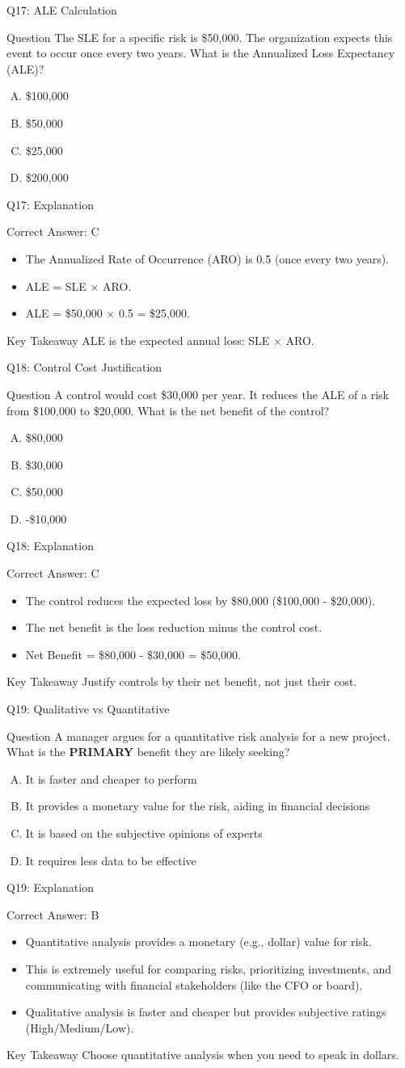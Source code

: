 \documentclass[aspectratio=169]{beamer}
\newcommand{\hq}[7]{%
	\begin{frame}{Q#1: #2}
		\begin{block}{Question}
			#3
		\end{block}
		\begin{enumerate}[(A)]
			#4
		\end{enumerate}
	\end{frame}
	\begin{frame}{Q#1: Explanation}
		\begin{block}{Correct Answer: #5}
			\begin{itemize}
				#6
			\end{itemize}
		\end{block}
		\begin{alertblock}{Key Takeaway}
			#7
		\end{alertblock}
	\end{frame}
}
\begin{document}
	\hq{17}{ALE Calculation}
	{The SLE for a specific risk is \$50,000. The organization expects this event to occur once every two years. What is the Annualized Loss Expectancy (ALE)?}
	{\item \$100,000
		\item \$50,000
		\item \$25,000
		\item \$200,000}
	{C}
	{\item The Annualized Rate of Occurrence (ARO) is 0.5 (once every two years).
		\item ALE = SLE × ARO.
		\item ALE = \$50,000 × 0.5 = \$25,000.}
	{ALE is the expected annual loss: SLE × ARO.}
	
	\hq{18}{Control Cost Justification}
	{A control would cost \$30,000 per year. It reduces the ALE of a risk from \$100,000 to \$20,000. What is the net benefit of the control?}
	{\item \$80,000
		\item \$30,000
		\item \$50,000
		\item -\$10,000}
	{C}
	{\item The control reduces the expected loss by \$80,000 (\$100,000 - \$20,000).
		\item The net benefit is the loss reduction minus the control cost.
		\item Net Benefit = \$80,000 - \$30,000 = \$50,000.}
	{Justify controls by their net benefit, not just their cost.}
	
	\hq{19}{Qualitative vs Quantitative}
	{A manager argues for a quantitative risk analysis for a new project. What is the \textbf{PRIMARY} benefit they are likely seeking?}
	{\item It is faster and cheaper to perform
		\item It provides a monetary value for the risk, aiding in financial decisions
		\item It is based on the subjective opinions of experts
		\item It requires less data to be effective}
	{B}
	{\item Quantitative analysis provides a monetary (e.g., dollar) value for risk.
		\item This is extremely useful for comparing risks, prioritizing investments, and communicating with financial stakeholders (like the CFO or board).
		\item Qualitative analysis is faster and cheaper but provides subjective ratings (High/Medium/Low).}
	{Choose quantitative analysis when you need to speak in dollars.}
	
\end{document}

